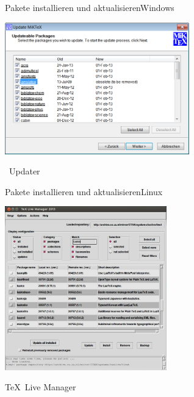 \begin{Frame}{Pakete installieren und aktualisieren}{Windows}
  \begin{minipage}{\textwidth}\begin{center}
    \includegraphics[width=8cm]{images/miktex-update}

    \MiKTeX\ Updater
  \end{center}\end{minipage}
\end{Frame}

\begin{Frame}{Pakete installieren und aktualisieren}{Linux}
  \begin{minipage}{\textwidth}\begin{center}
    \includegraphics[width=7cm]{images/texlive-update}

    \TeX\ Live Manager
  \end{center}\end{minipage}
\end{Frame}

